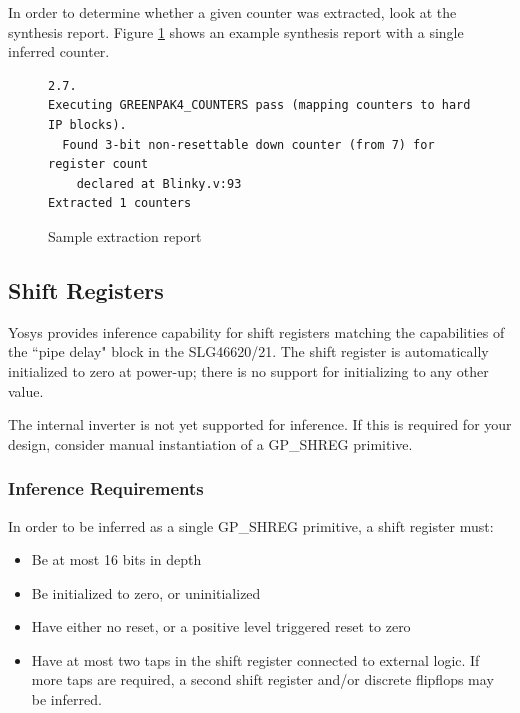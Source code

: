 \documentclass{article}
\begin{document}
In order to determine whether a given counter was extracted, look at the synthesis report. Figure 
\ref{counter-extraction} shows an example synthesis report with a single inferred counter.

\begin{figure}[h]
{\small
\begin{verbatim}
2.7.
Executing GREENPAK4_COUNTERS pass (mapping counters to hard IP blocks).
  Found 3-bit non-resettable down counter (from 7) for register count
    declared at Blinky.v:93
Extracted 1 counters
\end{verbatim}
}
\caption{Sample extraction report}
\label{counter-extraction}
\end{figure}


\pagebreak
\subsection{Shift Registers}

Yosys provides inference capability for shift registers matching the capabilities of the ``pipe delay" block in the 
SLG46620/21. The shift register is automatically initialized to zero at power-up; there is no support for initializing 
to any other value.

The internal inverter is not yet supported for inference. If this is required for your design, consider manual 
instantiation of a GP\_SHREG primitive.

\subsubsection{Inference Requirements}

In order to be inferred as a single GP\_SHREG primitive, a shift register must:

\begin{itemize}
\item Be at most 16 bits in depth
\item Be initialized to zero, or uninitialized
\item Have either no reset, or a positive level triggered reset to zero
\item Have at most two taps in the shift register connected to external logic. If more taps are required, a second 
shift register and/or discrete flipflops may be inferred. 
\end{itemize}
\end{document}
